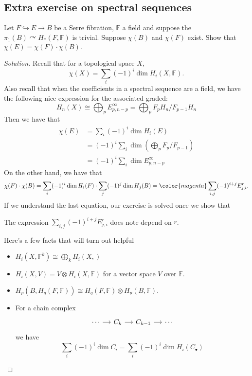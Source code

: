 \subsection{Extra exercise on spectral sequences}\label{ssec:Extra exercise on spectral sequences}
\begin{exercise}[June 20]
	Let $F\hookrightarrow E\to B$ be a Serre fibration, $\mathbb{F}$ a field and suppose the $\pi_{1}(B)\curvearrowright  H_{*}(F,\mathbb{F})$ is trivial. Suppose $\chi(B)$ and $\chi(F)$ exist. Show that $\chi(E)=\chi(F)\cdot \chi(B)$.
\end{exercise}
\begin{proof}[Solution]
	Recall that for a topological space $X$,
	\[\chi(X)=\sum_{i}(-1)^i\dim H_{i}(X,\mathbb{F}).\]
	Also recall that when the coefficients in a spectral sequence are a field, we have the following nice expression for the associated graded:
	\[H_{n}(X)\cong \bigoplus_{p}E^\infty_{p,n-p}=\bigoplus_{p} F_{p}H_{n}/F_{p-1}H_{n} \]
	Then we have that 
	\begin{align*}
		\chi(E)&=\sum_{i}(-1)^i\dim H_{i}(E)\\
		       &=(-1)^i\sum_{i}\dim \left( \bigoplus_{p}F_{p}/F_{p-1}   \right)\\
		       &=(-1)^i\sum_{i}\dim E^\infty_{p,n-p}
	\end{align*}
	On the other hand, we have that
	\[\chi(F)\cdot \chi(B)=\sum_{i}(-1)^i\dim H_{i}(F)\cdot \sum_{j}(-1)^{j}\dim H_{j}(B)={\color{magenta}\sum_{i,j}(-1)^{i+j}E^r_{j,i}}.\]
	If we understand the last equation, our exercise is solved once we show that
	\begin{claim}
		The expression $\sum_{i,j}(-1)^{i+j}E^r_{j,i}$	does note depend on $r$.
	\end{claim}
	

	Here's a few facts that will turn out helpful
	\begin{itemize}
		\item $H_{i}(X,\mathbb{F}^k)\cong \bigoplus_{k} H_{i}(X,\mathbb{}) $
		\item $H_{i}(X,V)=V\otimes H_{i}(X,\mathbb{F})$ for a vector space $V$ over $\mathbb{F}$.
		\item $H_{p}(B,H_{q}(F,\mathbb{F}))\cong H_{q}(F,\mathbb{F})\otimes H_{p}(B,\mathbb{F})$.
		\item For a chain complex 
			\[\begin{tikzcd}[column sep=small]
				\cdots \arrow[r]&C_{k}\arrow[r]&C_{k-1}\arrow[r]&\cdots
			\end{tikzcd}\]
			we have
			\[\sum_{i}(-1)^i\dim C_i=\sum_{i}(-1)^i\dim H_{i}(C_{\bullet})\]
	\end{itemize}
	
\end{proof}


